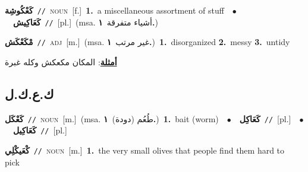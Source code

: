 \documentclass[10pt,a4paper,twoside]{article} %
\begin{document}
\begin{multicols}{2}
{\setlength\topsep{0pt}\textbf{\foreignlanguage{arabic}{كَعْكُوشِة}}\ {\color{gray}\texttt{//}\color{black}}\ \textsc{noun}\ [f.]\ \textbf{1.}~a miscellaneous assortment of stuff\ \ $\bullet$\ \ \setlength\topsep{0pt}\textbf{\foreignlanguage{arabic}{كَعَاكِيش}}\ {\color{gray}\texttt{//}\color{black}}\ [pl.]\ \color{gray}(msa. \foreignlanguage{arabic}{أشياء متفرقة}~\foreignlanguage{arabic}{\textbf{١.}})\color{black}\ } \vspace{2mm}

{\setlength\topsep{0pt}\textbf{\foreignlanguage{arabic}{مْكَعْكَش}}\ {\color{gray}\texttt{//}\color{black}}\ \textsc{adj}\ [m.]\ \color{gray}(msa. \foreignlanguage{arabic}{غير مرتب}~\foreignlanguage{arabic}{\textbf{١.}})\color{black}\ \textbf{1.}~disorganized  \textbf{2.}~messy  \textbf{3.}~untidy\  \begin{flushright}\color{gray}\foreignlanguage{arabic}{\textbf{\underline{\foreignlanguage{arabic}{أمثلة}}}: المكان مكعكش وكله غبرة}\end{flushright}\color{black}} \vspace{2mm}

\vspace{-3mm}
\subsection*{\color{blue}\foreignlanguage{arabic}{ك.ع.ك.ل}\color{blue}{}} 

{\setlength\topsep{0pt}\textbf{\foreignlanguage{arabic}{كَعْكَل}}\ {\color{gray}\texttt{//}\color{black}}\ \textsc{noun}\ [m.]\ \color{gray}(msa. \foreignlanguage{arabic}{طُعُم (دودة)}~\foreignlanguage{arabic}{\textbf{١.}})\color{black}\ \textbf{1.}~bait (worm)\ \ $\bullet$\ \ \setlength\topsep{0pt}\textbf{\foreignlanguage{arabic}{كَعَاكِل}}\ {\color{gray}\texttt{//}\color{black}}\ [pl.]\ \ $\bullet$\ \ \setlength\topsep{0pt}\textbf{\foreignlanguage{arabic}{كَعَاكِيل}}\ {\color{gray}\texttt{//}\color{black}}\ [pl.]\ } \vspace{2mm}

{\setlength\topsep{0pt}\textbf{\foreignlanguage{arabic}{كْعَيكْلِي}}\ {\color{gray}\texttt{//}\color{black}}\ \textsc{noun}\ [m.]\ \textbf{1.}~the very small olives that people find them hard to pick\ } \vspace{2mm}


\end{multicols}
\end{document}
